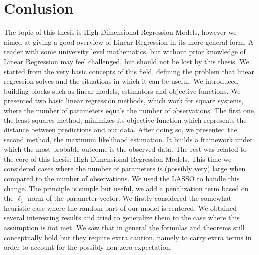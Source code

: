 \chapter{Conlusion}

The topic of this thesis is High Dimensional Regression Models, however we aimed at giving a good overview of Linear Regression in its more general form. A reader with some university level mathematics, but without prior knowledge of Linear Regression may feel challenged, but should not be lost by this thesis. We started from the very basic concepts of this field, defining the problem that linear regression solves and the situations in which it can be useful. We introduced building blocks such as linear models, estimators and objective functions. We presented two basic linear regression methods, which work for square systems, where the number of parameters equals the number of observations. The first one, the least squares method, minimizes its objective function which represents the distance between predictions and our data. After doing so, we presented the second method, the maximum likelihood estimation. It builds a framework under which the most probable outcome is the observed data. The rest was related to the core of this thesis: High Dimensional Regression Models. This time we considered cases where the number of parameters is (possibly very) large when compared to the number of observations. We used the LASSO to handle this change. The principle is simple but useful, we add a penalization term based on the \(\ell_1\) norm of the parameter vector. We firstly considered the somewhat heuristic case where the random part of our model is centered. We obtained several interesting results and tried to generalize them to the case where this assumption is not met. We saw that in general the formulas and theorems still conceptually hold but they require extra caution, namely to carry extra terms in order to account for the possibly non-zero expectation.